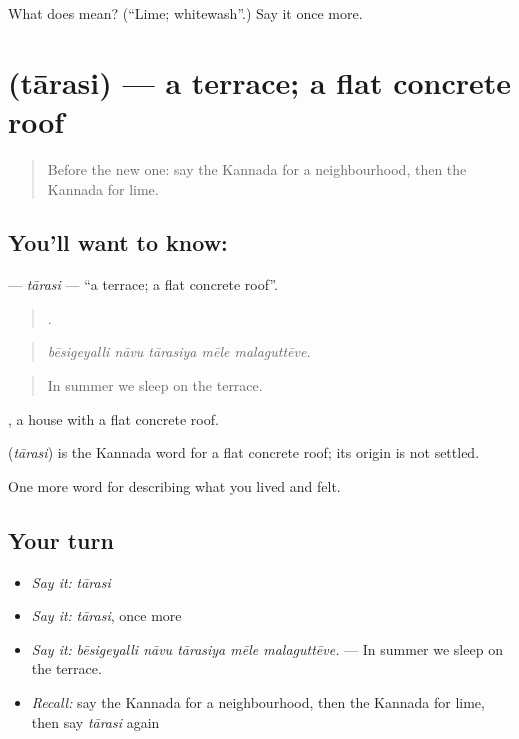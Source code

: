 \begin{tcolorbox}[breakable,colback=teal!4,colframe=teal!35!black,title={Before you move on}]
What does  mean? (\textquotedblleft{}Lime; whitewash\textquotedblright{}.) Say it once more.
\end{tcolorbox}
\section[\texorpdfstring{\kn{ತಾರಸಿ} (tārasi)}{ತಾರಸಿ (tārasi)}]{ (tārasi) — a terrace; a flat concrete roof}

\label{lesson:KA-C546-tarasi}



\begin{quote}
Before the new one: say the Kannada for a neighbourhood, then the Kannada for lime.
\end{quote}

\subsection*{You'll want to know: }
\textbf{} — \emph{tārasi} — \textquotedblleft{}a terrace; a flat concrete roof\textquotedblright{}.

\begin{quote}
    .
\end{quote}

\begin{quote}
\emph{bēsigeyalli nāvu tārasiya mēle malaguttēve.}
\end{quote}

\begin{quote}
In summer we sleep on the terrace.
\end{quote}

 , a house with a flat concrete roof.

\begin{cousinweb}
\textbf{} (\emph{tārasi}) is the Kannada word for a flat concrete roof; its origin is not settled.
\end{cousinweb}

\begin{grammarlens}[title={What you've built}]
One more word for describing what you lived and felt.
\end{grammarlens}

\subsection*{Your turn}
\begin{itemize}
\raggedright
  \item \emph{Say it:} \emph{tārasi}
  \item \emph{Say it:} \emph{tārasi}, once more
  \item \emph{Say it:} \emph{bēsigeyalli nāvu tārasiya mēle malaguttēve.} — In summer we sleep on the terrace.
  \item \emph{Recall:} say the Kannada for a neighbourhood, then the Kannada for lime, then say \emph{tārasi} again
\end{itemize}

